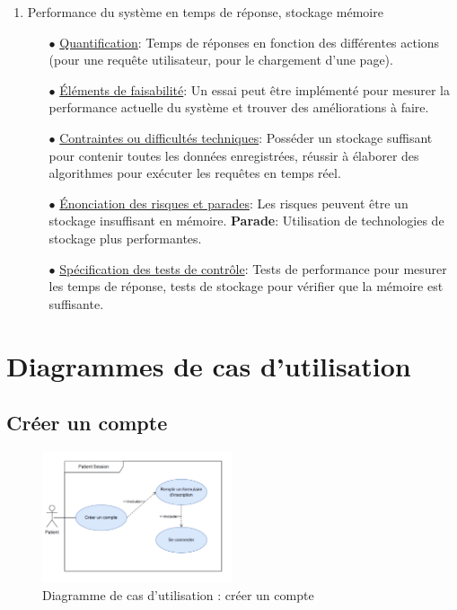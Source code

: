 \documentclass[a4paper]{report}
\begin{document}
\begin{enumerate}
\item Performance du système en temps de réponse, stockage mémoire

\begin{itemize}
    \item[$\bullet$] \underline{Quantification}: Temps de réponses en fonction des différentes actions (pour une requête utilisateur, pour le chargement d'une page).
    \item[$\bullet$] \underline{Éléments de faisabilité}: Un essai peut être implémenté pour mesurer la performance actuelle du système et trouver des améliorations à faire.
    \item[$\bullet$] \underline{Contraintes ou difficultés techniques}: Posséder un stockage suffisant pour contenir toutes les données enregistrées, réussir à élaborer des algorithmes pour exécuter les requêtes en temps réel.
    \item[$\bullet$] \underline{Énonciation des risques et parades}:  Les risques peuvent être un stockage insuffisant en mémoire.\newline
    \textbf{Parade}: Utilisation de technologies de stockage plus performantes.
    \item[$\bullet$] \underline{Spécification des tests de contrôle}: Tests de performance pour mesurer les temps de réponse, tests de stockage pour vérifier que la mémoire est suffisante.
\end{itemize} 

\end{enumerate}

\section{Diagrammes de cas d'utilisation}

\subsection{Créer un compte}
\begin{figure}[H]
    \vspace{-10pt}
    \centering
    \includegraphics[width=0.5\textwidth]{besoins/creer-compte.png}
    \caption{Diagramme de cas d'utilisation : créer un compte}
    \label{fig:DCU1}
\end{figure}
\end{document}
